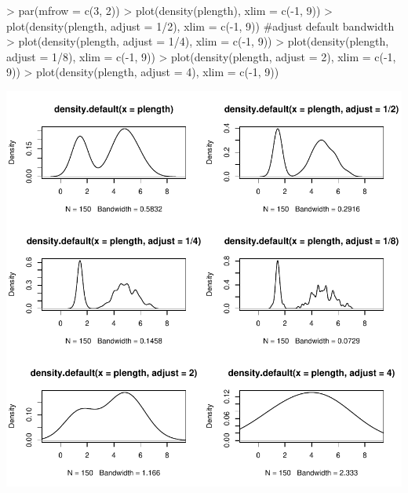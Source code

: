 \documentclass[12pt,letterpaper,final]{article}
\begin{document}
\begin{Schunk}
\begin{Sinput}
> par(mfrow = c(3, 2))
> plot(density(plength), xlim = c(-1, 9))
> plot(density(plength, adjust = 1/2), xlim = c(-1, 9))  #adjust default bandwidth
> plot(density(plength, adjust = 1/4), xlim = c(-1, 9))
> plot(density(plength, adjust = 1/8), xlim = c(-1, 9))
> plot(density(plength, adjust = 2), xlim = c(-1, 9))
> plot(density(plength, adjust = 4), xlim = c(-1, 9))
\end{Sinput}
\end{Schunk}
\includegraphics{lect_main-028}
\end{document}
